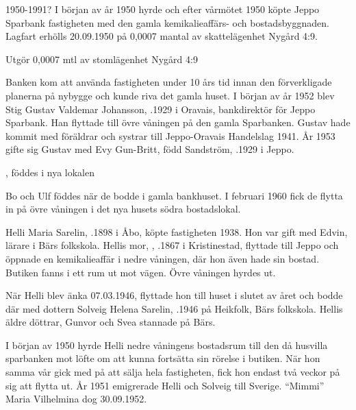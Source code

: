 1950-1991?
I början av år 1950 hyrde och efter vårmötet 1950 köpte Jeppo Sparbank fastigheten med den gamla kemikalieaffärs- och 	bostadsbyggnaden. Lagfart erhölls 20.09.1950 på 0,0007 mantal	av skattelägenhet Nygård 4:9.



Utgör 0,0007 mtl av stomlägenhet Nygård 4:9

Banken kom att använda fastigheten under 10 års tid innan den förverkligade planerna på nybygge och kunde riva det gamla huset. I början av år 1952 blev Stig Gustav Valdemar Johansson, .1929 i Oravais, bankdirektör för Jeppo Sparbank. Han flyttade till övre våningen på den gamla Sparbanken. Gustav hade kommit med föräldrar och systrar till Jeppo-Oravais Handelslag 1941. År 1953 gifte sig Gustav med Evy Gun-Britt, född Sandström, .1929 i Jeppo.
\begin{jhchildren}
  \item {}
  \item {}
  \item {}, föddes i nya lokalen
\end{jhchildren}
Bo och Ulf föddes när de bodde i gamla bankhuset. I februari 1960 fick de flytta in på övre våningen i det nya husets södra bostadslokal.


Helli Maria Sarelin, .1898 i Åbo, köpte fastigheten 1938. Hon var gift med Edvin, lärare i Bärs folkskola. Hellis mor, , .1867 i Kristinestad, flyttade till Jeppo och öppnade en kemikalieaffär i nedre våningen, där hon även hade sin bostad. Butiken fanns i ett rum ut mot vägen. Övre våningen hyrdes ut.

När Helli blev änka 07.03.1946, flyttade hon till huset i slutet av året och bodde där med dottern Solveig Helena Sarelin, .1946 på Heikfolk, Bärs folkskola. Hellis äldre döttrar, Gunvor och Svea stannade på Bärs.

I början av 1950 hyrde Helli nedre våningens bostadsrum till den då husvilla sparbanken mot löfte om att kunna fortsätta sin rörelse i butiken. När hon samma vår gick med på att sälja hela fastigheten, fick hon endast två veckor på sig att flytta ut. År 1951 emigrerade Helli och Solveig till Sverige. ``Mimmi'' Maria Vilhelmina dog 30.09.1952.

